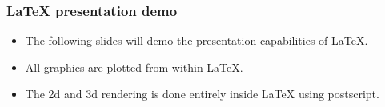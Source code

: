 \begin{frame}
\frametitle{\LaTeX{} presentation demo}
\begin{itemize}
\item The following slides will demo the presentation capabilities of \LaTeX.
\item All graphics are plotted from within \LaTeX.
\item The 2d and 3d rendering is done entirely inside \LaTeX{} using postscript.
\end{itemize}

\end{frame}


